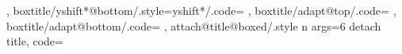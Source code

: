 {{{  }},
  boxtitle/yshift*@bottom/.style={yshift*/.code={%
    \tcbdimto{}%
    \tcbdimto\kvtcb@yinnershift@boxedtitle{\kvtcb@yshift@boxedtitle-\kvtcb@bottom@rule@stand}%
    \ifdim\dimexpr\kvtcb@yinnershift@boxedtitle<0pt\relax\let\kvtcb@yinnershift@boxedtitle\tcb@zpt\fi%
  }},
  boxtitle/adapt@top/.code={%
    \ifdim\dimexpr\tcboxedtitleheight+\kvtcb@yshift@boxedtitle>0pt\relax%
      \tcbdimto\kvtcb@bbtop@stand{\kvtcb@bbtop@stand+\tcboxedtitleheight+\kvtcb@yshift@boxedtitle}%
    \fi%
    \tcbdimto\kvtcb@top{\kvtcb@top-\kvtcb@yinnershift@boxedtitle}%
  },
  boxtitle/adapt@bottom/.code={%
    \ifdim\dimexpr\tcboxedtitleheight-\kvtcb@yshift@boxedtitle>0pt\relax%
      \tcbdimto\kvtcb@bbbottom@stand{\kvtcb@bbbottom@stand+\tcboxedtitleheight-\kvtcb@yshift@boxedtitle}%
    \fi%
    \tcbdimto\kvtcb@bottom{\kvtcb@bottom+\kvtcb@yinnershift@boxedtitle}%
  },
  attach@title@boxed/.style n args={6}{%
    detach title,
    code={\def\tcb@specialtitle@hook{%
      \ifx\tcbtitletext\@empty\else%
      \tcb@trans@set@boxedsize{#2}%
      \colorlet{tcbtranscol@frame}{tcbcolframe}%
      \colorlet{tcbtranscol@back}{tcbcolbacktitle}%
      \let\tcb@trans@skin@current\kvtcb@skin@current%
      \let\tcb@trans@boxedstyle\kvtcb@style@boxedtitle%
      \setbox\tcb@titlebox\color@hbox\bgroup\color{tcbcoltitle}\kvtcb@fonttitle\kvtcb@before@boxedtitle\kvtcb@haligntitle\tcb@insert@before@title\tcbtitletext\tcb@insert@after@title\kvtcb@after@boxedtitle\egroup\color@endbox%
      \setbox\tcb@titlebox\color@hbox\tcbox[skin=\tcb@trans@skin@current,colframe=tcbtranscol@frame,colback=tcbtranscol@back,%
          code={\pgfkeysalsofrom\tcb@trans@boxedsize\pgfkeysalsofrom\tcb@trans@boxedstyle%
            \ifcase#6
            \or%
              \global\tcbdimto\tcb@xshift@boxedtitle@delta{\kvtcb@left@rule+\kvtcb@boxsep+\kvtcb@leftupper}%
            \else%
              \global\tcbdimto\tcb@xshift@boxedtitle@delta{\kvtcb@right@rule+\kvtcb@boxsep+\kvtcb@rightupper}%
            \fi%
          }%
        ]{\box\tcb@titlebox}\color@endbox%
      \tcbdimto\tcboxedtitleheight{\ht\tcb@titlebox+\dp\tcb@titlebox}%
      \tcbdimto\tcboxedtitlewidth{\wd\tcb@titlebox}%
      \tcbset{boxtitle/.cd,xshift=0pt,yshift=0pt,yshifttext=0pt,yshift*@#2,#1,adapt@#2}%
      \let\tcb@specialgeonodes@first\relax%
      \let\tcb@specialgeonodes@middle\relax%
      \let\tcb@specialgeonodes@last\relax%
      \ifcase#6
        \tcbdimto\tcb@xshift@boxedtitle{\kvtcb@xshift@boxedtitle}%
      \or%
        \tcbdimto\tcb@xshift@boxedtitle{\kvtcb@xshift@boxedtitle+\kvtcb@left@rule+\kvtcb@boxsep+\kvtcb@leftupper-\tcb@xshift@boxedtitle@delta}%
}}}}
